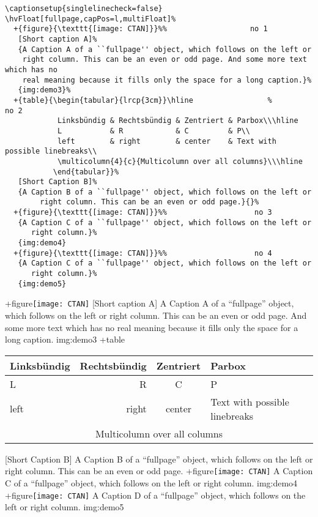 \documentclass[twoside]{scrartcl}
\begin{document}
\begin{lstlisting}
\captionsetup{singlelinecheck=false}
\hvFloat[fullpage,capPos=l,multiFloat]%
  +{figure}{\texttt{[image: CTAN]}}%%                   no 1
   [Short caption A]%
   {A Caption A of a ``fullpage'' object, which follows on the left or
    right column. This can be an even or odd page. And some more text which has no
    real meaning because it fills only the space for a long caption.}%
   {img:demo3}%
  +{table}{\begin{tabular}{lrcp{3cm}}\hline                 %             no 2
            Linksbündig & Rechtsbündig & Zentriert & Parbox\\\hline
            L           & R            & C         & P\\
            left        & right        & center    & Text with possible linebreaks\\
            \multicolumn{4}{c}{Multicolumn over all columns}\\\hline
           \end{tabular}}%
   [Short Caption B]%
   {A Caption B of a ``fullpage'' object, which follows on the left or
        right column. This can be an even or odd page.}{}%
  +{figure}{\texttt{[image: CTAN]}}%%                    no 3
   {A Caption C of a ``fullpage'' object, which follows on the left or
      right column.}%
   {img:demo4}
  +{figure}{\texttt{[image: CTAN]}}%%                    no 4
   {A Caption C of a ``fullpage'' object, which follows on the left or
      right column.}%
   {img:demo5}
\end{lstlisting}

\Float[Multi]
\captionsetup{singlelinecheck=false}
\hvFloat[fullpage,capPos=l,multiFloat]%
  +{figure}{\texttt{[image: CTAN]}}%
   [Short caption A]%
   {A Caption A of a ``fullpage'' object, which follows on the left or
    right column. This can be an even or odd page. And some more text which has no
    real meaning because it fills only the space for a long caption.}%
   {img:demo3}%
  +{table}{\begin{tabular}{lrcp{3cm}}\hline                 %
            Linksbündig & Rechtsbündig & Zentriert & Parbox\\\hline
            L           & R            & C         & P\\
            left        & right        & center    & Text with possible linebreaks\\
            \multicolumn{4}{c}{Multicolumn over all columns}\\\hline
           \end{tabular}}%
   [Short Caption B]%
   {A Caption B of a ``fullpage'' object, which follows on the left or
        right column. This can be an even or odd page.}{}%
  +{figure}{\texttt{[image: CTAN]}}%
   {A Caption C of a ``fullpage'' object, which follows on the left or
      right column.}%
   {img:demo4}
  +{figure}{\texttt{[image: CTAN]}}%
   {A Caption D of a ``fullpage'' object, which follows on the left or
      right column.}%
   {img:demo5}


\blinddocument

\Blindtext

\blindtext
\end{document}
